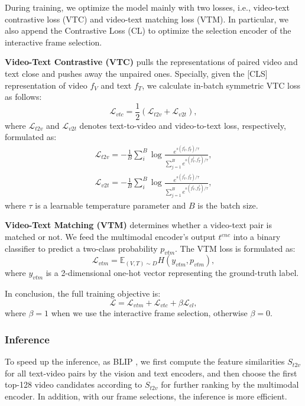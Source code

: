 \documentclass[11pt]{article}
\begin{document}
During training, we optimize the model mainly with two losses, i.e., video-text contrastive loss (VTC) and video-text matching loss (VTM).
In particular, we also append the Contrastive Loss (CL) to optimize the selection encoder of the interactive frame selection.

\textbf{Video-Text Contrastive (VTC)} pulls the representations of paired video and text close and pushes away the unpaired ones.
Specially, given the [CLS] representation of video $f_V$ and text $f_T$, we calculate in-batch symmetric VTC loss as follows:
\begin{equation}
\mathcal{L}_{vtc} = \frac{1}{2} (\mathcal{L}_{t2v} + \mathcal{L}_{v2t}),
\end{equation}
where $\mathcal{L}_{t2v}$ and $\mathcal{L}_{v2t}$ denotes text-to-video and video-to-text loss, respectively, formulated as:
\begin{eqnarray}
    \mathcal{L}_{t2v} = -\frac{1}{B} \sum_i^B \log \frac{e^{s(f^i_V,f^i_T)/\tau}}{\sum\nolimits_{j=1}^B e^{s(f^j_V,f^i_T)/\tau}},     \\
    \mathcal{L}_{v2t} = -\frac{1}{B} \sum_i^B \log \frac{e^{s(f^i_V,f^i_T)/\tau}}{\sum\nolimits_{j=1}^B e^{s(f^i_V,f^j_T)/\tau}},
\end{eqnarray}   
where $\tau$ is a learnable temperature parameter and $B$ is the batch size.

\textbf{Video-Text Matching (VTM)} determines whether a video-text pair is matched or not. 
We feed the multimodal encoder's output $t^{enc}$ into a binary classifier to predict a two-class probability $p_{vtm}$. The VTM loss is formulated as:
\begin{equation}
    \mathcal{L}_{vtm} = \mathbb{E}_{(V,T) \sim D}H(y_{vtm}, p_{vtm}),
\end{equation}
where $y_{vtm}$ is a 2-dimensional one-hot vector representing the ground-truth label. 

In conclusion, the full training  objective is:
\begin{equation}
    \mathcal{L} = \mathcal{L}_{vtm} + \mathcal{L}_{vtc} + \beta \mathcal{L}_{cl},
\end{equation}
where $\beta=1$ when we use the interactive frame selection, otherwise $\beta=0$.

\subsubsection{Inference}
To speed up the inference, as BLIP \cite{li2022blip}, we first compute the feature similarities $S_{t2v}$ for all text-video pairs by the vision and text encoders, and then choose the first top-128 video candidates according to $S_{t2v}$ for further ranking by the multimodal encoder. 
In addition, with our frame selections, the inference is more efficient.
\end{document}

